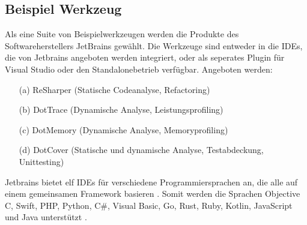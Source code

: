 \subsection{Beispiel Werkzeug}
\label{subsec:Codeanalyse_analyse}
Als eine Suite von Beispielwerkzeugen werden die Produkte des Softwareherstellers JetBrains gewählt. Die Werkzeuge sind entweder in die IDEs, die von Jetbrains angeboten werden integriert, oder als seperates Plugin für Visual Studio oder den Standalonebetrieb verfügbar. Angeboten werden:
\begin{itemize}
	\item[(a)] ReSharper (Statische Codeanalyse, Refactoring)
	\item[(b)] DotTrace (Dynamische Analyse, Leistungsprofiling)
	\item[(c)] DotMemory (Dynamische Analyse, Memoryprofiling)
	\item[(d)] DotCover (Statische und dynamische Analyse, Testabdeckung, Unittesting)
\end{itemize}
Jetbrains bietet elf IDEs für verschiedene Programmiersprachen an, die alle auf einem gemeinsamen Framework basieren \cite{intelliJPlattform}. Somit werden die Sprachen Objective C, Swift, PHP, Python, C\#, Visual Basic, Go, Rust, Ruby, Kotlin, JavaScript und Java unterstützt \cite{jetbrains_products}. 

